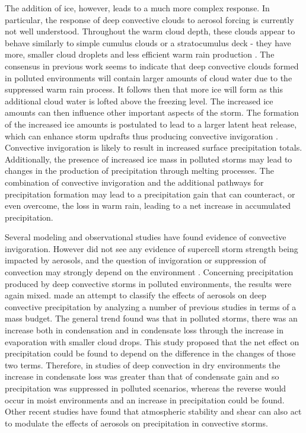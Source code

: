 The addition of ice, however, leads to a much more complex response.  In particular, the response of deep convective clouds to aerosol forcing is currently not well understood.  Throughout the warm cloud depth, these clouds appear to behave similarly to simple cumulus clouds or a stratocumulus deck - they have more, smaller cloud droplets and less efficient warm rain production \citep{vandenHeever:2006p1147,Rosenfeld:2008p24,Storer:2010p8001,taoreview}.  The consensus in previous work seems to indicate that deep convective clouds formed in polluted environments will contain larger amounts of cloud water due to the suppressed warm rain process.  It follows then that more ice will form as this additional cloud water is lofted above the freezing level.  The increased ice amounts can then influence other important aspects of the storm.  The formation of the increased ice amounts is postulated to lead to a larger latent heat release, which can enhance storm updrafts thus producing convective invigoration \citep{Andreae:2004p32,Khain:2005p71,vandenHeever:2006p1147}.  Convective invigoration is likely to result in increased surface precipitation totals.  Additionally, the presence of increased ice mass in polluted storms may lead to changes in the production of precipitation through melting processes.  The combination of convective invigoration and the additional pathways for precipitation formation may lead to a precipitation gain that can counteract, or even overcome, the loss in warm rain, leading to a net increase in accumulated precipitation. 

Several modeling \citep{Khain:2005p71,vandenHeever:2006p1147,vandenHeever:2007p53,Lee:2008p3014} and observational \citep{Andreae:2004p32,Rosenfeld:2008p24} studies have found evidence of convective invigoration.  However \citet{Storer:2010p8001} did not see any evidence of supercell storm strength being impacted by aerosols, and the question of invigoration or suppression of convection may strongly depend on the environment \citep{Khain:2008p35,Fan:2009p7470}.  Concerning precipitation produced by deep convective storms in polluted environments, the results were again mixed.  \citet{Khain:2009p18} made an attempt to classify the effects of aerosols on deep convective precipitation by analyzing a number of previous studies in terms of a mass budget.  The general trend found was that in polluted storms, there was an increase both in condensation and in condensate loss through the increase in evaporation with smaller cloud drops.  This study proposed that the net effect on precipitation could be found to depend on the difference in the changes of those two terms.  Therefore, in studies of deep convection in dry environments the increase in condensate loss was greater than that of condensate gain and so precipitation was suppressed in polluted scenarios, whereas the reverse would occur in moist environments and an increase in precipitation could be found.  Other recent studies have found that atmospheric stability \citep{Storer:2010p8001} and shear \citep{Fan:2009p7470} can also act to modulate the effects of aerosols on precipitation in convective storms. 

